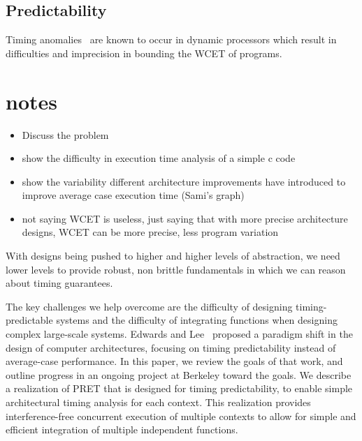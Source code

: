 \subsection{Predictability}
\label{bookmark:timing_anomalies}
  
  Timing anomalies~\cite{Reineke06adefinition,Lundqvist1999} are known to occur in dynamic processors which result in difficulties and imprecision in
bounding the WCET of programs.





\section{notes}

\begin{itemize}
  \item Discuss the problem
  \item show the difficulty in execution time analysis of a simple c code
  \item show the variability different architecture improvements have introduced to improve average case execution time (Sami's graph)
  \item not saying WCET is useless, just saying that with more precise architecture designs, WCET can be more precise, less program variation
\end{itemize}

With designs being pushed to higher and higher levels of abstraction, we need lower levels to provide robust, non brittle fundamentals in which we can reason about timing guarantees.

The key challenges we help overcome are the difficulty of designing timing-predictable systems and the difficulty of integrating functions when designing complex large-scale systems.
Edwards and Lee~\cite{Edwards2007PRETcase} proposed a paradigm shift in the design of computer architectures, focusing on timing predictability instead of average-case performance. 
In this paper, we review the goals of that work, and outline progress in an ongoing project at Berkeley toward the goals.
We describe a realization of PRET that is designed for timing predictability, to enable simple architectural timing analysis for each context. 
This realization provides interference-free concurrent execution of multiple contexts to allow for simple and efficient integration of multiple independent functions.


